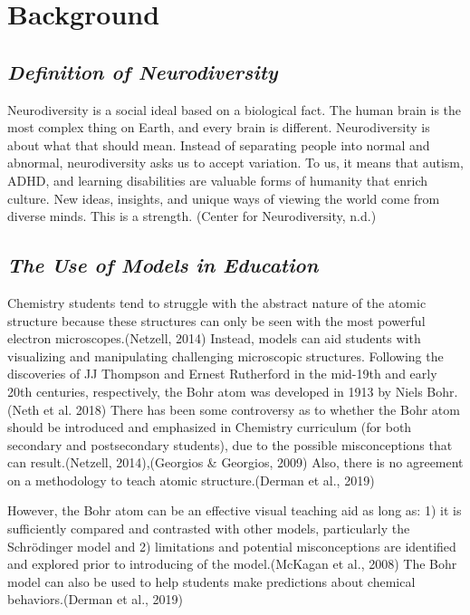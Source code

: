 \documentclass[11pt]{sig-alternate}
\begin{document}
\section*{\vspace{140mm}}
\section*{Background}
\begin{large}
\subsection*{\textit{Definition of Neurodiversity}}
Neurodiversity is a social ideal based on a biological fact. The human brain is the most complex thing on Earth, and every brain is different. Neurodiversity is about what that should mean. Instead of separating people into normal and abnormal, neurodiversity asks us to accept variation. To us, it means that autism, ADHD, and learning disabilities are valuable forms of humanity that enrich culture. New ideas, insights, and unique ways of viewing the world come from diverse minds. This is a strength. (Center for Neurodiversity, n.d.)

\subsection*{\textit{The Use of Models in Education}}
Chemistry students tend to struggle with the abstract nature of the atomic structure because these structures can only be seen with the most powerful electron microscopes.(Netzell, 2014) Instead, models can aid students with visualizing and manipulating challenging microscopic structures. Following the discoveries of JJ Thompson and Ernest Rutherford in the mid-19th and early 20th centuries, respectively, the Bohr atom was developed in 1913 by Niels Bohr.(Neth et al. 2018) There has been some controversy as to whether the Bohr atom should be introduced and emphasized in Chemistry curriculum (for both secondary and postsecondary students), due to the possible misconceptions that can result.(Netzell, 2014),(Georgios \& Georgios, 2009) Also, there is no agreement on a methodology to teach atomic structure.(Derman et al., 2019) 

However, the Bohr atom can be an effective visual teaching aid as long as: 1) it is sufficiently compared and contrasted with other models, particularly the Schrödinger model and 2) limitations and potential misconceptions are identified and explored prior to introducing of the model.(McKagan et al., 2008) The Bohr model can also be used to help students make predictions about chemical behaviors.(Derman et al., 2019) 


\end{large}
\end{document}
